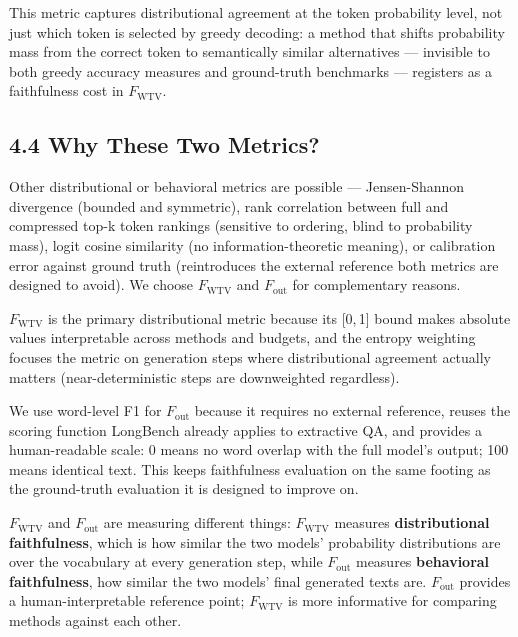\documentclass[10pt,letterpaper]{article}
\begin{document}
This metric captures distributional agreement at the token probability level, not
just which token is selected by greedy decoding: a method that shifts probability
mass from the correct token to semantically similar alternatives --- invisible to
both greedy accuracy measures and ground-truth benchmarks --- registers as a
faithfulness cost in \(F_{\text{WTV}}\).

\hypertarget{why-these-two-metrics}{%
\subsection{4.4 Why These Two Metrics?}\label{why-these-two-metrics}}

Other distributional or behavioral metrics are possible ---
Jensen-Shannon divergence (bounded and symmetric), rank correlation
between full and compressed top-k token rankings (sensitive to ordering,
blind to probability mass), logit cosine similarity (no
information-theoretic meaning), or calibration error against ground
truth (reintroduces the external reference both metrics are designed to
avoid). We choose \(F_{\text{WTV}}\) and \(F_{\text{out}}\) for
complementary reasons.

\(F_{\text{WTV}}\) is the primary distributional metric because its
[0,\,1] bound makes absolute values interpretable across methods and
budgets, and the entropy weighting focuses the metric on generation
steps where distributional agreement actually matters (near-deterministic
steps are downweighted regardless). 

We use word-level F1 for
\(F_{\text{out}}\) because it requires no external reference, reuses the
scoring function LongBench already applies to extractive QA, and provides a
human-readable scale: 0 means no word overlap with the full model's
output; 100 means identical text. This keeps faithfulness evaluation on
the same footing as the ground-truth evaluation it is designed to improve on.

\(F_{\text{WTV}}\) and \(F_{\text{out}}\) are measuring different things:
\(F_{\text{WTV}}\) measures \textbf{distributional faithfulness}, which is how
similar the two models' probability distributions are over the
vocabulary at every generation step, while \(F_{\text{out}}\) measures
\textbf{behavioral faithfulness}, how similar the two models' final
generated texts are.
\(F_{\text{out}}\) provides a human-interpretable reference point; \(F_{\text{WTV}}\) is
more informative for comparing methods against each other.
\end{document}
